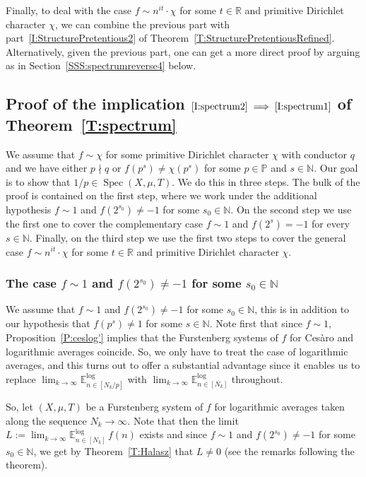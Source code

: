 \documentclass[11pt]{amsart}
\theoremstyle{definition}
\newcommand{\lE}{\mathbb{E}^{\log}}
\newcommand{\N}{{\mathbb N}}
\renewcommand{\P}{{\mathbb P}}
\newcommand{\R}{{\mathbb R}}
\DeclareMathOperator{\spec}{Spec}
\begin{document}
Finally, to deal with the case $f\sim n^{it}\cdot \chi$ for some $t\in \R$ and primitive Dirichlet character $\chi$,  we can combine the previous part with  part~\eqref{I:StructurePretentious2} of Theorem~\ref{T:StructurePretentiousRefined}. Alternatively, given the previous part,  one can get a more direct proof by arguing as in Section~\ref{SSS:spectrumreverse4} below. 



\subsection{Proof of the implication $\eqref{I:spectrum2}\implies \eqref{I:spectrum1}$ of Theorem~\ref{T:spectrum}}\label{SS:spectrumproof2}
   We assume that $f\sim \chi$ for some primitive Dirichlet character $\chi$ with conductor $q$  and we have either $p\nmid q$ or 
$f(p^s)\neq \chi(p^s)$ for some $p\in \P$ and $s\in\N$.  Our goal is to show that $1/p\in \spec(X,\mu,T)$.
We do this in three  steps. The bulk of the proof is contained on the first step, where we work under the additional hypothesis  $f\sim 1$ and $f(2^{s_0})\neq -1$ for some $s_0\in \N$.  On the second step we use the first one to  cover the complementary case $f\sim 1$ and $f(2^s)= -1$ for every $s\in \N$. Finally, on the third step we use the first two steps to cover the general case $f\sim n^{it} \cdot   \chi$ for some $t\in \R$ and primitive Dirichlet character $\chi$.

\subsubsection{The case  $f\sim 1$ and $f(2^{s_0})\neq -1$ for some $s_0\in \N$}\label{SSS:spectrumreverse1} We assume that
$f\sim 1$ and $f(2^{s_0})\neq -1$ for some $s_0\in \N$, this is in addition to our hypothesis that
$f(p^s)\neq 1$ for some $s\in\N$.
Note first that since $f\sim 1$,  Proposition~\ref{P:ceslog'} implies that the Furstenberg systems of $f$ for Ces\`aro and logarithmic averages  coincide. So, we only have to treat the case of logarithmic averages, and this turns out to offer  a  substantial advantage since
it enables us to replace $\lim_{k\to\infty}\lE_{n\in[N_k/p]}$ with
$\lim_{k\to\infty}\lE_{n\in[N_k]}$ throughout.

So, let  $(X,\mu,T)$ be a Furstenberg system of $f$  for logarithmic averages
taken along the sequence $N_k\to \infty$.
 Note that then the limit
$L:=\lim_{k\to\infty}  \lE_{n\in [N_k]} \, f(n)$ exists and since $f\sim 1$ and $f(2^{s_0})\neq -1$ for some $s_0\in \N$, we get by Theorem~\ref{T:Halasz} that  $L\neq 0$ (see the remarks following the  theorem).
\end{document}
